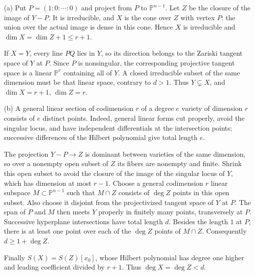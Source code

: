 (a) Put $P=(1:0:\cdots:0)$ and project from $P$ to $\mathbb{P}^{n-1}$. Let $Z$ be the closure of the image of $Y-P$. It is irreducible, and $X$ is the cone over $Z$ with vertex $P$: the union over the actual image is dense in this cone. Hence $X$ is irreducible and $\dim X=\dim Z+1\leq r+1$.

If $X=Y$, every line $PQ$ lies in $Y$, so its direction belongs to the Zariski tangent space of $Y$ at $P$. Since $P$ is nonsingular, the corresponding projective tangent space is a linear $\mathbb{P}^r$ containing all of $Y$. A closed irreducible subset of the same dimension must be that linear space, contrary to $d>1$. Thus $Y\subsetneq X$, and $\dim X=r+1$, $\dim Z=r$.

(b) A general linear section of codimension $r$ of a degree $e$ variety of dimension $r$ consists of $e$ distinct points. Indeed, general linear forms cut properly, avoid the singular locus, and have independent differentials at the intersection points; successive differences of the Hilbert polynomial give total length $e$.

The projection $Y-P\to Z$ is dominant between varieties of the same dimension, so over a nonempty open subset of $Z$ its fibers are nonempty and finite. Shrink this open subset to avoid the closure of the image of the singular locus of $Y$, which has dimension at most $r-1$. Choose a general codimension $r$ linear subspace $M\subset\mathbb{P}^{n-1}$ such that $M\cap Z$ consists of $\deg Z$ points in this open subset. Also choose it disjoint from the projectivized tangent space of $Y$ at $P$. The span of $P$ and $M$ then meets $Y$ properly in finitely many points, transversely at $P$. Successive hyperplane intersections have total length $d$. Besides the length $1$ at $P$, there is at least one point over each of the $\deg Z$ points of $M\cap Z$. Consequently $d\geq1+\deg Z$.

Finally $S(X)=S(Z)[x_0]$, whose Hilbert polynomial has degree one higher and leading coefficient divided by $r+1$. Thus $\deg X=\deg Z<d$.
